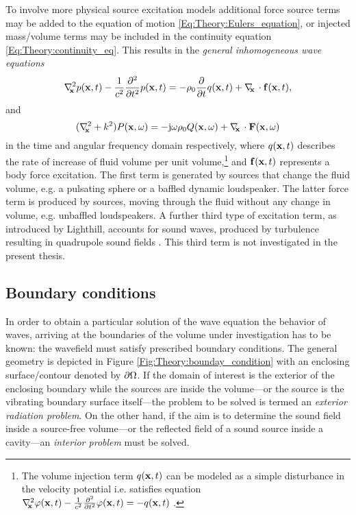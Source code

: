 To involve more physical source excitation models additional force source terms may be added to the equation of motion \eqref{Eq:Theory:Eulers_equation}, or injected mass/volume terms may be included in the continuity equation \eqref{Eq:Theory:continuity_eq}.
This results in the \emph{general inhomogeneous wave equations} \cite{Pierce1991, Kinsler2000, Howe2007}
\begin{equation}
\nabla^2_{\!\!\mathbf{x}} p(\mathbf{x},t) -\frac{1}{c^2}\frac{\partial^2}{\partial t^2}p(\mathbf{x},t) = - \rho_0 \frac{\partial}{\partial t} q(\mathbf{x},t) + \nabla_{\!\!\mathbf{x}}\, \cdot \mathbf{f}(\mathbf{x},t),
\end{equation}
and
\begin{equation}
(\nabla^2_{\!\!\mathbf{x}} + k^2 ) P(\mathbf{x},\omega ) = - \mathrm{j} \omega \rho_0 Q(\mathbf{x},\omega) + \nabla_{\!\!\mathbf{x}}\, \cdot \mathbf{F}(\mathbf{x},\omega)
\label{Eq:Theory:Inhomogene_wave_eq_freq_domain}
\end{equation}
in the time and angular frequency domain respectively, where $q(\mathbf{x},t)$ describes the rate of increase of fluid volume per unit volume,\footnote{The volume injection term $q(\mathbf{x},t)$ can be modeled as a simple disturbance in the velocity potential i.e. satisfies equation $\nabla^2_{\!\!\mathbf{x}} \varphi(\mathbf{x},t) -\frac{1}{c^2}\frac{\partial^2}{\partial t^2}\varphi(\mathbf{x},t) = -q(\mathbf{x},t)$ \cite{Jensen2007}.} and $\mathbf{f}(\mathbf{x},t)$ represents a body force excitation.
The first term is generated by sources that change the fluid volume, e.g. a pulsating sphere or a baffled dynamic loudspeaker.
The latter force term is produced by sources, moving through the fluid without any change in volume, e.g. unbaffled loudspeakers.
A further third type of excitation term, as introduced by Lighthill, accounts for sound waves, produced by turbulence resulting in quadrupole sound fields \cite{Lighthill1952, Lighthill1954, Kinsler2000}.
This third term is not investigated in the present thesis.

\subsection{Boundary conditions}
\label{Section:Theory:Boundary_conditions}

In order to obtain a particular solution of the wave equation the behavior of waves, arriving at the boundaries of the volume under investigation has to be known: the wavefield must satisfy prescribed boundary conditions.
The general geometry is depicted in Figure \ref{Fig:Theory:bounday_condition} with an enclosing surface/contour denoted by $\partial \Omega$.
If the domain of interest is the exterior of the enclosing boundary while the sources are inside the volume---or the source is the vibrating boundary surface itself---the problem to be solved is termed an \emph{exterior radiation problem}. 
On the other hand, if the aim is to determine the sound field inside a source-free volume---or the reflected field of a sound source inside a cavity---an \emph{interior problem} must be solved.


